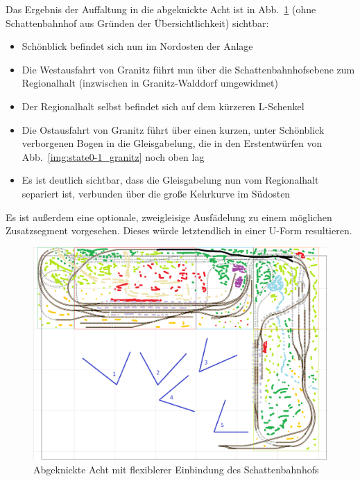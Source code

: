 Das Ergebnis der Auffaltung in die abgeknickte Acht ist in Abb.~\ref{img:state2_granitz_modules_details} (ohne Schattenbahnhof aus Gr\"unden der \"Ubersichtlichkeit) sichtbar:
\begin{itemize}
	\item Sch\"onblick befindet sich nun im Nordosten der Anlage
	\item Die Westausfahrt von Granitz f\"uhrt nun \"uber die Schattenbahnhofsebene zum Regionalhalt (inzwischen in Granitz-Walddorf umgewidmet)
	\item Der Regionalhalt selbst befindet sich auf dem k\"urzeren L-Schenkel
	\item Die Ostausfahrt von Granitz f\"uhrt \"uber einen kurzen, unter Sch\"onblick verborgenen Bogen in die Gleisgabelung, die in den Erstentw\"urfen von Abb.~\ref{img:state0-1_granitz} noch oben lag
	\item Es ist deutlich sichtbar, dass die Gleisgabelung nun vom Regionalhalt separiert ist, verbunden \"uber die gro{\ss}e Kehrkurve im S\"udosten
\end{itemize}

Es ist au{\ss}erdem eine optionale, zweigleisige Ausf\"adelung zu einem m\"oglichen Zusatzsegment vorgesehen.
Dieses w\"urde letztendlich in einer U-Form resultieren.

\begin{figure}[h]
\centering
  \includegraphics[width=1.0\textwidth]{img/map_evolution/state2_granitz_modules_details.png}
	\caption{Abgeknickte Acht mit flexiblerer Einbindung des Schattenbahnhofs}
	\label{img:state2_granitz_modules_details}
\end{figure}

